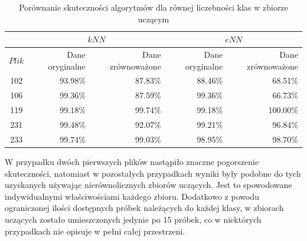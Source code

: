 \begin{table}[H]
	\centering
	\begin{tabular}{|c|r|r|r|r|}
		\hline
		& \multicolumn{2}{c|}{$kNN$} & \multicolumn{2}{c|}{$eNN$} \\
		\hline
		$Plik$ & Dane oryginalne & Dane zrównoważone & Dane oryginalne & Dane zrównoważone \\
		\hline
		
		102 & 93.98\% & 87.83\% & 88.46\% & 68.51\% \\ 	
		\hline
		106 & 99.36\% & 87.59\% & 99.36\% & 66.73\% \\ 
		\hline	
		119 & 99.18\% & 99.74\% & 99.18\% & 100.00\% \\ 	
		\hline  
		231 & 99.48\% & 92.07\% & 99.21\% & 96.84\% \\ 	
		\hline                                   
		233 & 99.74\% & 99.03\% & 98.95\% & 98.70\% \\ 	
		\hline                                                                    
	\end{tabular}
	\caption{Porównanie skuteczności algorytmów dla równej liczebności klas w zbiorze uczącym}
	\label{tab:matlab-skutecznosc-rowno}
\end{table}

W przypadku dwóch pierwszych plików nastąpiło znaczne pogorszenie skuteczności, natomiast w pozostałych przypadkach wyniki były podobne do tych uzyskanych używając nierównolicznych zbiorów uczących. Jest to spowodowane indywidualnymi właściwościami każdego zbioru. Dodatkowo z powodu ograniczonej ilości dostępnych próbek należących do każdej klasy, w zbiorach uczących zostało umieszczonych jedynie po 15 próbek, co w niektórych przypadkach nie opisuje w pełni całej przestrzeni. 




